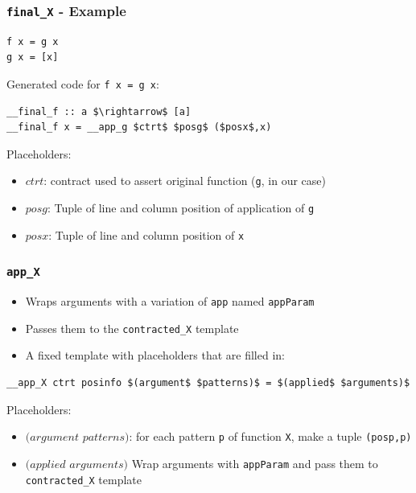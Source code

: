 \documentclass[]{beamer}
\begin{document}
\begin{frame}[fragile]
\frametitle{\texttt{\underline{\hspace{1.5em}}final\_X} - Example}

\begin{lstlisting}[mathescape]
f x = g x
g x = [x]
\end{lstlisting}

Generated code for \texttt{f x = g x}:

\begin{lstlisting}[mathescape]
__final_f :: a $\rightarrow$ [a]
__final_f x = __app_g $ctrt$ $posg$ ($posx$,x)
\end{lstlisting}

Placeholders:
\begin{itemize}
	\item $ctrt$: contract used to assert original function (\texttt{g}, in our case)
	\item $posg$: Tuple of line and column position of application of \texttt{g}
	\item $posx$: Tuple of line and column position of  \texttt{x}
\end{itemize}

\end{frame}

\begin{frame}[fragile]
\frametitle{\texttt{\underline{\hspace{1.5em}}app\_X}}

\begin{itemize}
	\item Wraps arguments with a variation of \texttt{app} named \texttt{appParam}
	\item Passes them to the \texttt{\underline{\hspace{1.5em}}contracted\_X} template
	\item A fixed template with placeholders that are filled in:
\end{itemize}

\begin{lstlisting}[mathescape]
__app_X ctrt posinfo $(argument$ $patterns)$ = $(applied$ $arguments)$
\end{lstlisting}

Placeholders:
\begin{itemize}
	\item $(argument$ $patterns)$: for each pattern \texttt{p} of function \texttt{X}, make a tuple \texttt{(posp,p)}
	\item $(applied$ $arguments)$ Wrap arguments with \texttt{appParam} and pass them to \texttt{\underline{\hspace{1.5em}}contracted\_X} template
\end{itemize}

\end{frame}
\end{document}
